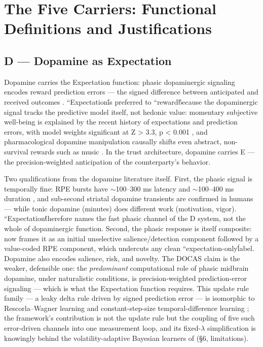 \documentclass[11pt,twocolumn]{article}
\theoremstyle{plain}
\begin{document}
\FloatBarrier
\section{The Five Carriers: Functional Definitions and Justifications}

\subsection{D — Dopamine as Expectation}

Dopamine carries the Expectation function: phasic dopaminergic signaling encodes reward prediction errors — the signed difference between anticipated and received outcomes \citep{schultz1997}. ``Expectation\'\' is preferred to ``reward\'\' because the dopaminergic signal tracks the predictive model itself, not hedonic value: momentary subjective well-being is explained by the recent history of expectations and prediction errors, with model weights significant at Z > 3.3, p < 0.001 \citep{rutledge2014}, and pharmacological dopamine manipulation causally shifts even abstract, non-survival rewards such as music \citep{ferreri2019}. In the trust architecture, dopamine carries E — the precision-weighted anticipation of the counterparty's behavior.

Two qualifications from the dopamine literature itself. First, the phasic signal is temporally fine: RPE bursts have $\sim$100–300 ms latency and $\sim$100–400 ms duration \citep{schultz1998}, and sub-second striatal dopamine transients are confirmed in humans \citep{kishida2011} — while tonic dopamine (minutes) does different work (motivation, vigor). ``Expectation\'\' therefore names the fast phasic channel of the D system, not the whole of dopaminergic function. Second, the phasic response is itself composite: \citet{schultz2016} now frames it as an initial unselective salience/detection component followed by a value-coded RPE component, which undercuts any clean ``expectation-only\'\' label. Dopamine also encodes salience, risk, and novelty. The DOCAS claim is the weaker, defensible one: the \textit{predominant} computational role of phasic midbrain dopamine, under naturalistic conditions, is precision-weighted prediction-error signaling — which is what the Expectation function requires. This update rule family — a leaky delta rule driven by signed prediction error — is isomorphic to Rescorla–Wagner learning \citep{rescorla1972} and constant-step-size temporal-difference learning \citep{sutton2018,daw2014}; the framework's contribution is not the update rule but the coupling of five such error-driven channels into one measurement loop, and its fixed-$\lambda$ simplification is knowingly behind the volatility-adaptive Bayesian learners of \citet{behrens2008} (\S{}6, limitations).
\end{document}
